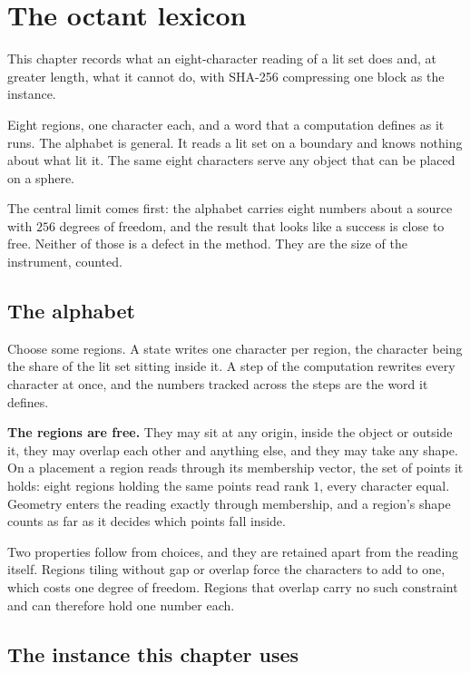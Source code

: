 \chapter{The octant lexicon}

This chapter records what an eight-character reading of a lit set does and, at greater length, what it cannot do, with SHA-256 compressing one block as the instance.

Eight regions, one character each, and a word that a computation defines as it runs. The alphabet is general. It reads a lit set on a boundary and knows nothing about what lit it. The same eight characters serve any object that can be placed on a sphere.

The central limit comes first: the alphabet carries eight numbers about a source with \(256\) degrees of freedom, and the result that looks like a success is close to free. Neither of those is a defect in the method. They are the size of the instrument, counted.

\section{The alphabet}

Choose some regions. A state writes one character per region, the character being the share of the lit set sitting inside it. A step of the computation rewrites every character at once, and the numbers tracked across the steps are the word it defines.

\textbf{The regions are free.} They may sit at any origin, inside the object or outside it, they may overlap each other and anything else, and they may take any shape. On a placement a region reads through its membership vector, the set of points it holds: eight regions holding the same points read rank \(1\), every character equal. Geometry enters the reading exactly through membership, and a region's shape counts as far as it decides which points fall inside.

Two properties follow from choices, and they are retained apart from the reading itself. Regions tiling without gap or overlap force the characters to add to one, which costs one degree of freedom. Regions that overlap carry no such constraint and can therefore hold one number each.

\section{The instance this chapter uses}

